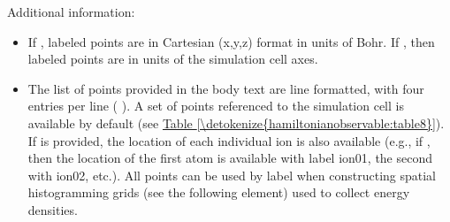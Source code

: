 \documentclass[letterpaper,10pt,english]{sphinxmanual}
\begin{document}
Additional information:
\begin{itemize}
\item {} 
 If , labeled points are in Cartesian
(x,y,z) format in units of Bohr. If , then labeled
points are in units of the simulation cell axes.

\item {} 
 The list of points provided in the body text are line
formatted, with four entries per line (  
). A set of points referenced to the simulation cell is
available by default (see \hyperref[\detokenize{hamiltonianobservable:table8}]{Table \ref{\detokenize{hamiltonianobservable:table8}}}). If
 is provided, the location of each individual
ion is also available (e.g., if , then
the location of the first atom is available with label ion01, the
second with ion02, etc.). All points can be used by label when
constructing spatial histogramming grids (see the following
 element) used to collect energy densities.

\end{itemize}
\end{document}
